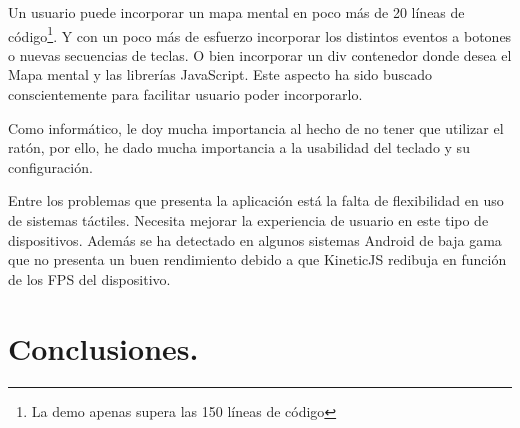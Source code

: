Un usuario puede incorporar un mapa mental en poco más de 20 líneas de código\footnote{La demo apenas supera las 150 líneas de código}. Y con un poco más de esfuerzo incorporar los distintos eventos a botones o nuevas secuencias de teclas. O bien incorporar un div contenedor donde desea el Mapa mental y las librerías JavaScript. Este aspecto ha sido buscado conscientemente para facilitar usuario poder incorporarlo. 



Como informático, le doy mucha importancia al hecho de no tener que utilizar el ratón, por ello, he dado mucha importancia a la usabilidad del teclado y su configuración. 

Entre los problemas que presenta la aplicación está la falta de flexibilidad en uso de sistemas táctiles. Necesita mejorar la experiencia de usuario en este tipo de dispositivos. Además se ha detectado en algunos sistemas Android de baja gama que no presenta un buen rendimiento debido a que KineticJS redibuja en función de los FPS del dispositivo. 

\section{Conclusiones.}


